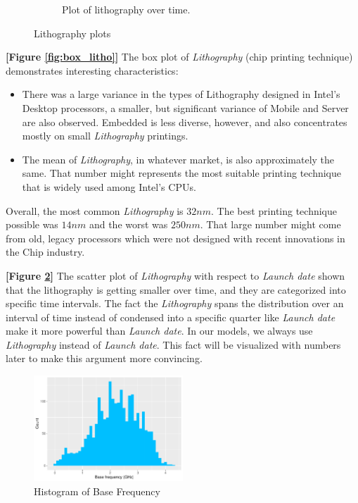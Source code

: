 \begin{figure}[H]
\begin{subfigure}[b]{0.49\textwidth}
        \caption{Plot of lithography over time.}
        \label{fig:scatter_litho}
    \end{subfigure}
    \caption{Lithography plots}
\end{figure}



\textbf{[Figure \ref{fig:box_litho}]} The box plot of \textit{Lithography} (chip printing technique) demonstrates interesting characteristics:
\begin{itemize}
    \item There was a large variance in the types of Lithography designed in Intel's Desktop processors, a smaller, but significant variance of 
    Mobile and Server are also observed. Embedded is less diverse, however, and also concentrates mostly on small \textit{Lithography} printings.

    \item The mean of \textit{Lithography}, in whatever market, is also approximately the same. That number might represents the most suitable 
    printing technique that is widely used among Intel's CPUs.
\end{itemize}

Overall, the most common \textit{Lithography} is $32 nm$. The best printing technique possible was $14 nm$ and the worst was $250 nm$. That large
number might come from old, legacy processors which were not designed with recent innovations in the Chip industry.

\textbf{[Figure \ref{fig:scatter_litho}]} The scatter plot of \textit{Lithography} with respect to \textit{Launch date} shown that the lithography
is getting smaller over time, and they are categorized into specific time intervals. The fact the \textit{Lithography} spans the distribution over
an interval of time instead of condensed into a specific quarter like \textit{Launch date} make it more powerful than \textit{Launch date}. In our
models, we always use \textit{Lithography} instead of \textit{Launch date}. This fact will be visualized with numbers later to make this argument 
more convincing.







\begin{figure}[H]
    \centering
    \includegraphics[width=0.5\textwidth]{./graphics/hist_bfreq.pdf}
    \caption{Histogram of Base Frequency}
    \label{fig:hist_bfreq}
\end{figure}

